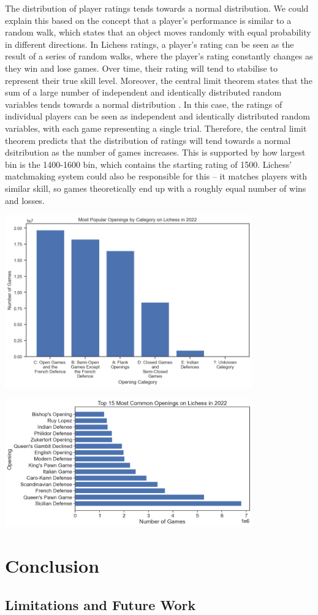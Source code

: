\documentclass[a4paper, 11pt]{article}
\begin{document}
The distribution of player ratings tends towards a normal distribution. We could explain this based on the concept that a player's performance is similar to a random walk, which states that an object moves randomly with equal probability in different directions. In Lichess ratings, a player's rating can be seen as the result of a series of random walks, where the player's rating constantly changes as they win and lose games. Over time, their rating will tend to stabilise to represent their true skill level. Moreover, the central limit theorem states that the sum of a large number of independent and identically distributed random variables tends towards a normal distribution \cite{le1986central}. In this case, the ratings of individual players can be seen as independent and identically distributed random variables, with each game representing a single trial. Therefore, the central limit theorem predicts that the distribution of ratings will tend towards a normal dsitribution as the number of games increases. This is supported by how largest bin is the 1400-1600 bin, which contains the starting rating of 1500. Lichess' matchmaking system could also be responsible for this -- it matches players with similar skill, so games theoretically end up with a roughly equal number of wins and losses.

\begin{center}
    \includegraphics[width=0.8\textwidth]{Most Popular Openings by Category.png}
\end{center}

\begin{center}
    \includegraphics[width=0.8\textwidth]{Most Popular Openings.png}
\end{center}

\section{Conclusion}

\subsection{Limitations and Future Work}



\end{document}
